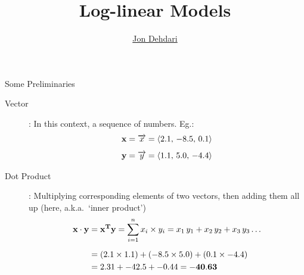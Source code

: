 \documentclass[xcolor=pdftex,x11names,table,hyperref]{beamer}
\begin{document}
\title{Log-linear Models \\[1.5em]
 }
\author{\href{http://jon.dehdari.org}{Jon Dehdari}}
\frame{\titlepage}


\begin{frame}{Some Preliminaries}
\begin{description}
	\item[Vector]: In this context, a sequence of numbers. Eg.:
	\begin{align*}
	{\bf x} &= \overrightarrow{x} = \langle 2.1, \, -8.5, \, 0.1 \rangle \\[0.5em]
	{\bf y} &= \overrightarrow{y} = \langle 1.1, \,  5.0, \, -4.4 \rangle
	\end{align*}
	\pause
	\item[Dot Product]: Multiplying corresponding elements of two vectors, then adding them all up (here, a.k.a.\ `inner product')
	\begin{align*}
	{\bf x \cdot y} &= {\bf x^Ty} =  \sum_{i=1}^n x_i \times y_i = x_1 \, y_1 + x_2 \, y_2 + x_3 \, y_3 \ldots \\[0.5em]
					&= (2.1 \times 1.1) + (-8.5 \times 5.0) + (0.1 \times -4.4) \\
					&= 2.31 + -42.5 + -0.44 = {\bf -40.63}
	\end{align*}
\end{description}
\end{frame}
\end{document}
